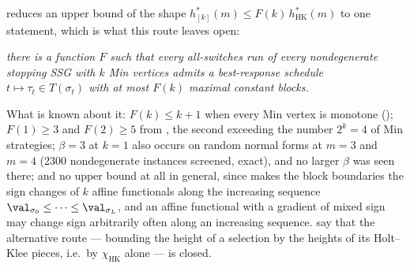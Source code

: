 \begin{remark}\label{mb:gap}
 reduces an upper bound of the shape
$h^{\ast}_{[k]}(m)\le F(k)\,h^{\ast}_{\mathrm{HK}}(m)$ to one statement,
which is what this route leaves open:

\emph{there is a function $F$ such that every all-switches run of every
nondegenerate stopping SSG with $k$ Min vertices admits a best-response
schedule $t\mapsto\tau_t\in T(\sigma_t)$ with at most $F(k)$ maximal
constant blocks.}

What is known about it: $F(k)\le k+1$ when every Min vertex is monotone
(); $F(1)\ge3$ and $F(2)\ge5$ from
, the second exceeding the number $2^{k}=4$ of Min
strategies; $\beta=3$ at $k=1$ also occurs on random normal forms at
$m=3$ and $m=4$ (2300 nondegenerate instances screened, exact), and no
larger $\beta$ was seen there; and no upper bound at all in general, since
 makes the block
boundaries the sign changes of $k$ affine functionals along the increasing
sequence $\val_{\sigma_0}\le\cdots\le\val_{\sigma_L}$, and an affine
functional with a gradient of mixed sign may change sign arbitrarily often
along an increasing sequence.  say
that the alternative route --- bounding the height of a selection by the
heights of its Holt--Klee pieces, i.e.\ by $\chi_{\mathrm{HK}}$ alone ---
is closed.
\end{remark}